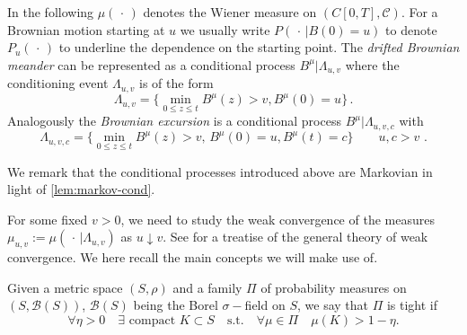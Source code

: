 %
%

In the following $ \mu(\,\cdot \,) $ denotes  the Wiener measure on $ (C[0,T], \mathscr C) $. 
For a Brownian motion starting at $ u $ we usually write $ P(\,\cdot \, | B(0) = u ) $  to denote $ P_u(\,\cdot \,) $
to underline the dependence on the starting point. 
The \emph{ drifted Brownian meander} can be represented as a conditional process $ B^\mu | \Lambda_{u,v} $ where 
 the conditioning event $ \Lambda_{u,v} $ is of the form
%
\[ \Lambda_{u,v} = \Big\{  \min_{ 0\leq z \leq t} B^{\mu}(z)  > v, B^\mu(0) = u\Big\} \, .\]
Analogously the \emph{Brownian excursion} is a conditional process $ B^\mu | \Lambda_{u,v,c}  $ with
\[ \Lambda_{u,v,c} = \Big\{ \min_{ 0\leq z \leq t} B^{\mu}(z)>v,\, B^\mu(0) = u, B^\mu(t) = c \Big\} 
\qquad u,c > v \,\, .
\]


We remark that the conditional processes introduced above are Markovian in light of \autoref{lem:markov-cond}.

For some fixed $ v > 0 $, we need to study the weak convergence of the measures 
$ \mu_{u,v} := \mu( \, \cdot \, | \Lambda_{u,v}) $ as $ u \downarrow v $. 
See \citet{billingsley2009convergence} for a treatise of the general theory of weak convergence. We here recall the main 
concepts we will make use of. 



\begin{definition}
	Given a metric space $ (S, \rho) $ and a family $ \Pi $ of probability measures on $ (S, \mathscr B ( S)) $, 
	 $ \mathscr B ( S) $ being the Borel $ \sigma- $field on $ S $, we say that $ \Pi $ is tight if
	 \[
	 \forall \eta > 0 \quad  \exists \text{ compact } K \subset S  \quad  \text{s.t.} \quad \forall \mu \in \Pi \quad  \mu(K) > 1 - \eta 
	 .
	 \]
\end{definition}

